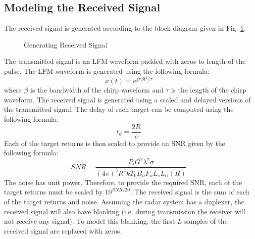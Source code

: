 \documentclass[12pt,letterpaper]{article}
\begin{document}
\subsection{Modeling the Received Signal}
The received signal is generated according to the block diagram given in Fig. \ref{Generate RX Sig}.
\begin{figure}[H]
\caption{Generating Received Signal}
\label{Generate RX Sig}
\end{figure}
\noindent
The transmitted signal is an LFM waveform padded with zeros to length of the pulse. The LFM waveform is generated using the following formula:
\begin{equation}
x(t) = e^{j\pi \beta t^2/\tau}
\end{equation}
where $\beta$ is the bandwidth of the chirp waveform and $\tau$ is the length of the chirp waveform. The received signal is generated using a scaled and delayed versions of the transmitted signal. The delay of each target can be computed using the following formula:
\begin{equation}
t_d = \frac{2R}{c}
\end{equation}
Each of the target returns is then scaled to provide an SNR given by the following formula:
\begin{equation}
SNR = \frac{P_t G^2 \lambda^2 \sigma}{(4\pi)^3 R^4 k T_0 B_n F_n L_s L_\alpha(R)}
\end{equation}
The noise has unit power. Therefore, to provide the required SNR, each of the target returns must be scaled by $10^{SNR/20}$. The received signal is the sum of each of the target returns and noise. Assuming the radar system has a duplexer, the received signal will also have blanking (i.e. during transmission the receiver will not receive any signal). To model this blanking, the first $L$ samples of the received signal are replaced with zeros.
\end{document}
